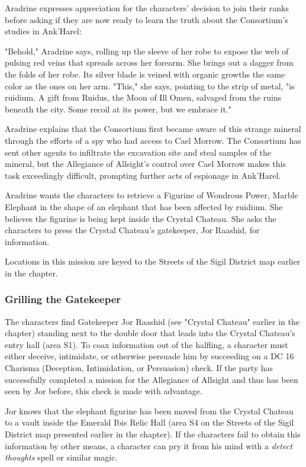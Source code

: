 \documentclass[10pt,a4paper,twoside,fancy,bg=print,twocolumn,openany,nodeprecatedcode]{dndbook}
\begin{document}
Aradrine expresses appreciation for the characters' decision to join their ranks before asking if they are now ready to learn the truth about the Consortium's studies in Ank'Harel:

\begin{DndReadAloud}{}
"Behold," Aradrine says, rolling up the sleeve of her robe to expose the web of pulsing red veins that spreads across her forearm. She brings out a dagger from the folds of her robe. Its silver blade is veined with organic growths the same color as the ones on her arm. "This," she says, pointing to the strip of metal, "is ruidium. A gift from Ruidus, the Moon of Ill Omen, salvaged from the ruins beneath the city. Some recoil at its power, but we embrace it."

\end{DndReadAloud}

Aradrine explains that the Consortium first became aware of this strange mineral through the efforts of a spy who had access to Cael Morrow. The Consortium has sent other agents to infiltrate the excavation site and steal samples of the mineral, but the Allegiance of Allsight's control over Cael Morrow makes this task exceedingly difficult, prompting further acts of espionage in Ank'Harel.

Aradrine wants the characters to retrieve a Figurine of Wondrous Power, Marble Elephant in the shape of an elephant that has been affected by ruidium. She believes the figurine is being kept inside the Crystal Chateau. She asks the characters to press the Crystal Chateau's gatekeeper, Jor Raashid, for information.

Locations in this mission are keyed to the Streets of the Sigil District map earlier in the chapter.

\subsubsection{Grilling the Gatekeeper}
The characters find Gatekeeper Jor Raashid (see "Crystal Chateau" earlier in the chapter) standing next to the double door that leads into the Crystal Chateau's entry hall (area S1). To coax information out of the halfling, a character must either deceive, intimidate, or otherwise persuade him by succeeding on a DC 16 Charisma (Deception, Intimidation, or Persuasion) check. If the party has successfully completed a mission for the Allegiance of Allsight and thus has been seen by Jor before, this check is made with advantage.

Jor knows that the elephant figurine has been moved from the Crystal Chateau to a vault inside the Emerald Ibis Relic Hall (area S4 on the Streets of the Sigil District map presented earlier in the chapter). If the characters fail to obtain this information by other means, a character can pry it from his mind with a \textit{detect thoughts} spell or similar magic.
\end{document}
